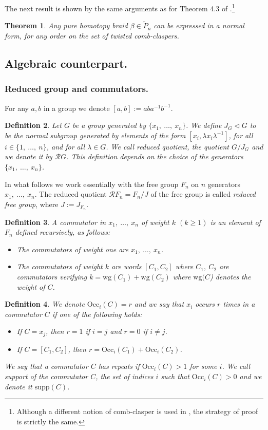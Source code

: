 \documentclass[11pt, a4paper, twoside,reqno]{amsart}
\newtheorem{thm}{Theorem}[section]
\newtheorem{defn}[thm]{Definition}
\newcommand\supp{\mathord{\mathrm{supp}}}
\newcommand\wg{\mathord{\mathrm{wg}}}
\newcommand\Occ{\mathord{\mathrm{Occ}}}
\begin{document}
The next result is shown by the same arguments as for Theorem 4.3 of \cite{YasuharaAkiraSelfdelteq}.\footnote{Although a different notion of comb-clasper is used in \cite{YasuharaAkiraSelfdelteq}, the strategy of proof is strictly the same.}
\begin{thm}\label{normalformex}\cite[Theorem 4.3]{YasuharaAkiraSelfdelteq}
Any pure homotopy braid $\beta\in\tilde P_n$ can be expressed in a normal form, for any order on the set of twisted comb-claspers.
\end{thm}


\subsection{Algebraic counterpart.}\label{sectionalg}
\subsubsection{Reduced group and commutators.}

For any $a,b$ in a group we denote $[a,b]:=aba^{-1}b^{-1}$.
\begin{defn}\label{defredgrp}
Let $G$ be a group generated by $\{x_1,\ \ldots,\ x_n\}$. We define $J_G\triangleleft G$ to be the normal subgroup generated by elements of the form $[x_i,\lambda x_i \lambda^{-1}]$, for all $i\in\{1,\ \ldots,\ n\}$, and for all $\lambda\in G$. We call \emph{reduced quotient}, the quotient $G/J_G$ and we denote it by $\mathcal RG$. This definition depends on the choice of the generators $\{x_1,\ \ldots,\ x_n\}$. 
\end{defn}
In what follows we work essentially with the free group $F_n$ on $n$ generators $x_1,\ \ldots,\ x_n$. The reduced quotient $\mathcal RF_n=F_n/J$ of the free group is called \emph{reduced free group}, where $J:=J_{F_n}$.
\begin{defn}
A \emph{commutator in $x_1 ,\ \ldots,\ x_n$ of weight $k$} $(k\geq1)$ is an element of $F_n$ defined recursively, as follows:
\begin{itemize}
    \item The commutators of weight one are $x_1 ,\ \ldots,\ x_n$.
    \item The commutators of weight $k$ are words $[C _1,C _2 ]$ where $C_1,\ C_2$ are commutators verifying $k=\wg(C_1 )+\wg(C_2)$ where $\wg(C$) denotes the weight of $C$.
\end{itemize}
\end{defn}
\begin{defn}
We denote $\Occ_i (C) = r$ and we say that $x_i$ \emph{occurs $r$ times} in a commutator $C$ if one of the following holds:
\begin{itemize}
    \item If $C = x_j$, then $r = 1$ if $i = j$ and $r = 0$ if $i\neq j$.
    \item If $C = [C_1,C_2 ]$, then $r = \Occ_i (C_1 ) + \Occ_i (C_2 )$.
\end{itemize}
We say that a commutator $C$ \emph{has repeats} if $\Occ_i(C)>1$ for some $i$.
We call \emph{support} of the commutator $C$, the set of indices $i$ such that $\Occ_i(C)>0$ and we denote it $\supp(C)$.
\end{defn}
\end{document}
